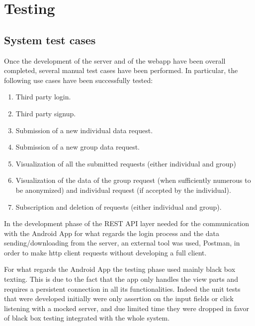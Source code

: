 \section{Testing}


\subsection{System test cases}
Once the development of the server and of the webapp have been overall completed, several manual test cases have been performed. In particular, the following use cases have been successfully tested:

\begin{enumerate}
\item Third party login.
\item Third party signup.
\item Submission of a new individual data request.
\item Submission of a new group data request.
\item Visualization of all the submitted requests (either individual and group)
\item Visualization of the data of the group request (when sufficiently numerous to be anonymized) and individual request (if accepted by the individual).
\item Subscription and deletion of requests (either individual and group).
\end{enumerate}

In the development phase of the REST API layer needed for the communication with the Android App for what regards the login process and the data sending/downloading from the server, an external tool was used, Postman, in order to make http client requests without developing a full client.


For what regards the Android App the testing phase used mainly black box texting. This is due to the fact that the app only handles the view parts and requires a persistent connection in all its functionalities. Indeed the unit tests that were developed initially were only assertion on the input fields or click listening with a mocked server, and due limited time they were dropped in favor of black box testing integrated with the whole system.
